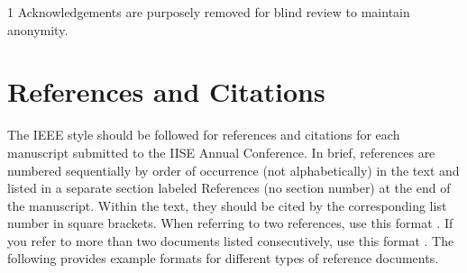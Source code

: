 \documentclass[10pt]{article}
\def\blind{1}
\begin{document}
\blind
Acknowledgements are purposely removed for blind review to maintain anonymity.
\fi


\section*{References and Citations}

The IEEE style \cite{ieee2018} should be followed for references and citations for each manuscript submitted to the IISE Annual Conference. In brief, references are numbered sequentially by order of occurrence (not alphabetically) in the text and listed in a separate section labeled References (no section number) at the end of the manuscript. Within the text, they should be cited by the corresponding list number in square brackets. When referring to two references, use this format \cite{yodo2016,tan2012}. If you refer to more than two documents listed consecutively, use this format \cite{ieee2018,yodo2016,tan2012,chang2006}. The following provides example formats for different types of reference documents.

\vspace{10pt}







\end{document}
